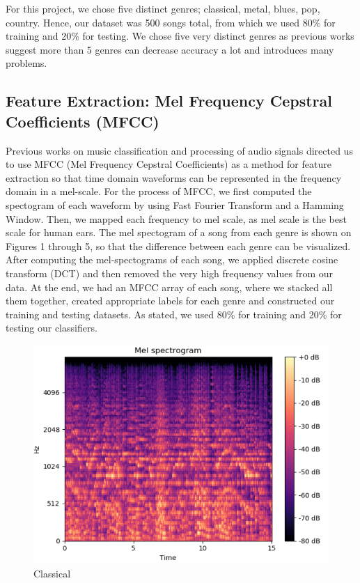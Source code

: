 For this project, we chose five distinct genres; classical, metal, blues, pop, country. Hence, our dataset was 500 songs total, from which we used 80\% for training and 20\% for testing. We chose five very distinct genres as previous works \cite{Chun:2010} suggest more than 5 genres can decrease accuracy a lot and introduces many problems. 

\subsection{Feature Extraction: Mel Frequency Cepstral Coefficients (MFCC)}
Previous works \cite{MFCC:2011} on music classification and processing of audio signals directed us to use MFCC (Mel Frequency Cepstral Coefficients) as a method for feature extraction so that time domain waveforms can be represented in the frequency domain in a mel-scale. For the process of MFCC, we first computed the spectogram of each waveform by using Fast Fourier Transform and a Hamming Window. Then, we mapped each frequency to mel scale, as mel scale is the best scale for human ears. The mel spectogram of a song from each genre is shown on Figures 1 through 5, so that the difference between each genre can be visualized. After computing the mel-spectograms of each song, we applied discrete cosine transform (DCT) and then removed the very high frequency values from our data. At the end, we had an MFCC array of each song, where we stacked all them together, created appropriate labels for each genre and constructed our training and testing datasets. As stated, we used 80\% for training and 20\% for testing our classifiers. 


\begin{figure}
\begin{center}
\includegraphics[scale=0.2]{./figures/classical.png}
\end{center}
\caption
{
Classical
}
\label{fig:big_picture1}
\end{figure}

